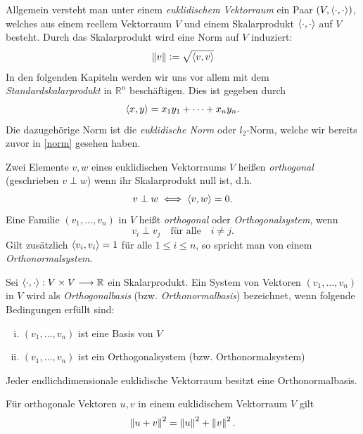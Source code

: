 Allgemein versteht man unter einem \textit{euklidischem Vektorraum} ein Paar $(V, \langle \cdot, \cdot \rangle)$, welches aus einem reellem Vektorraum $V$ und einem Skalarprodukt $\langle \cdot, \cdot \rangle$ auf $V$ besteht. Durch das Skalarprodukt wird eine Norm auf $V$ induziert:
$$\left\lVert v \right\rVert \vcentcolon= \sqrt{\langle v, v \rangle}$$
In den folgenden Kapiteln werden wir uns vor allem mit dem \textit{Standardskalarprodukt} in $\mathbb{R}^n$ beschäftigen. Dies ist gegeben durch 
$$\langle x, y \rangle = x_1y_1 + \cdots + x_ny_n.$$
Die dazugehörige Norm ist die \textit{euklidische Norm} oder $l_2$-Norm, welche wir bereits zuvor in \ref{norm} gesehen haben.

\begin{defn}
Zwei Elemente $v,w$ eines euklidischen Vektorraums $V$ heißen \textit{orthogonal} (geschrieben $v \perp w$) wenn ihr Skalarprodukt null ist, d.h.
$$v \perp w \iff \langle v, w \rangle = 0.$$
Eine Familie $(v_1, \ldots, v_n)$ in $V$ heißt \textit{orthogonal} oder \textit{Orthogonalsystem}, wenn
$$v_i \perp v_j \quad \text{für alle} \quad i \neq j.$$
Gilt zusätzlich $\langle v_i, v_i \rangle = 1$ für alle $1 \leq i \leq n$, so spricht man von einem \textit{Orthonormalsystem}.
\end{defn}

\begin{defn}
Sei $\langle \cdot, \cdot \rangle: V \times V \longrightarrow \mathbb{R}$ ein Skalarprodukt. Ein System von Vektoren $(v_1, \ldots, v_n)$ in $V$ wird als \textit{Orthogonalbasis} (bzw. \textit{Orthonormalbasis}) bezeichnet, wenn folgende Bedingungen erfüllt sind:
\begin{enumerate}[(i)]
\item $(v_1, \ldots, v_n)$ ist eine Basis von $V$
\item $(v_1, \ldots, v_n)$ ist ein Orthogonalsystem (bzw. Orthonormalsystem)
\end{enumerate}
\end{defn}

\begin{thm}
Jeder endlichdimensionale euklidische Vektorraum besitzt eine Orthonormalbasis.
\end{thm}

\begin{thm}
\label{pythagoras}
Für orthogonale Vektoren $u,v$ in einem euklidischem Vektorraum $V$ gilt
$$\left\lVert u+v \right\rVert^2 = \left\lVert u \right\rVert^2 + \left\lVert v \right\rVert^2.$$
\end{thm}

